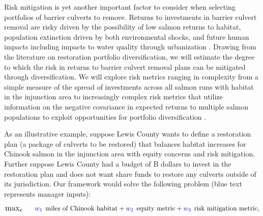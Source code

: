 \documentclass[12pt]{elsarticle}
\begin{document}
%
Risk mitigation is yet another important factor to consider when selecting portfolios of barrier culverts to remove. Returns to investments in barrier culvert removal are risky driven by the possibility of low salmon returns to habitat, population extinction driven by both environmental shocks, and future human impacts including impacts to water quality through urbanization \citep{ettinger2021prioritizing}. Drawing from the literature on restoration portfolio diversification, we will estimate the degree to which the risk in returns to barrier culvert removal plans can be mitigated through diversification. We will explore risk metrics ranging in complexity from a simple measure of the spread of investments across all salmon runs with habitat in the injunction area to increasingly complex risk metrics that utilize information on the negative covariance in expected returns to multiple salmon populations to exploit opportunities for portfolio diversification \citep{sanchirico2008empirical, jardine2015fishermen, johnston2002combining}.  


As an illustrative example, suppose Lewis County wants to define a restoration plan (a package of culverts to be restored) that balances habitat increases for Chinook salmon in the injunction area with equity concerns and risk mitigation. Further suppose Lewis County had a budget of B dollars to invest in the restoration plan and does not want share funds to restore any culverts outside of its jurisdiction. Our framework would solve the following problem (blue text represents manager inputs):

\begin{equation*}
\substack{\text{\large max}}_{\boldsymbol{c}}\hspace{0.25in} \textcolor{blue}{w_1}\:\: \text{miles of Chinook habitat} + \textcolor{blue}{w_2}\:\: \text{equity metric} + \textcolor{blue}{w_3}\:\: \text{risk mitigation metric},
\end{equation*}
\end{document}
